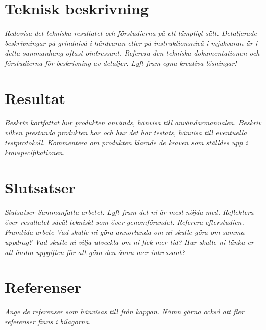 \documentclass[11pt]{article}
\begin{document}
\begin{flushleft}
\pagebreak

\section{Teknisk beskrivning}
\textit{Redovisa det tekniska resultatet och förstudierna på ett lämpligt sätt. Detaljerade beskrivningar på grindnivå i hårdvaran eller på instruktionsnivå i mjukvaran är i detta sammanhang oftast ointressant. Referera den tekniska dokumentationen och förstudierna för beskrivning av detaljer. Lyft fram egna kreativa lösningar!}
\pagebreak

\section{Resultat}
\textit{Beskriv kortfattat hur produkten används, hänvisa till användarmanualen.}
\textit{Beskriv vilken prestanda produkten har och hur det har testats, hänvisa till eventuella testprotokoll.}
\textit{Kommentera om produkten klarade de kraven som ställdes upp i kravspecifikationen. }

\pagebreak

\section{Slutsatser}
\textit{Slutsatser
Sammanfatta arbetet. 
Lyft fram det ni är mest nöjda med.
Reflektera över resultatet såväl tekniskt som över genomförandet. Referera efterstudien.}
\textit{Framtida arbete
Vad skulle ni göra annorlunda om ni skulle göra om samma uppdrag?
Vad skulle ni vilja utveckla om ni fick mer tid?
Hur skulle ni tänka er att ändra uppgiften för att göra den ännu mer intressant?}

\pagebreak

\section{Referenser}
\textit{Ange de referenser som hänvisas till från kappan. Nämn gärna också att fler referenser finns i bilagorna.}

\pagebreak
{}
%
%

\pagebreak


\appendix

\end{flushleft}
\end{document}
